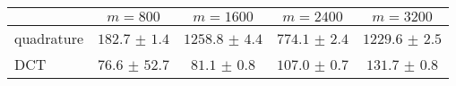 \centering
\renewcommand{\arraystretch}{1.2}
\begin{tabular}{@{}lcccc@{}}
\toprule
 & $m=800$ & $m=1600$ & $m=2400$ & $m=3200$\\
\midrule
quadrature & $182.7$ $\pm$ $1.4$ & $1258.8$ $\pm$ $4.4$ & $774.1$ $\pm$ $2.4$ & $1229.6$ $\pm$ $2.5$ \\
DCT & $76.6$ $\pm$ $52.7$ & $81.1$ $\pm$ $0.8$ & $107.0$ $\pm$ $0.7$ & $131.7$ $\pm$ $0.8$ \\
\bottomrule
\end{tabular}
